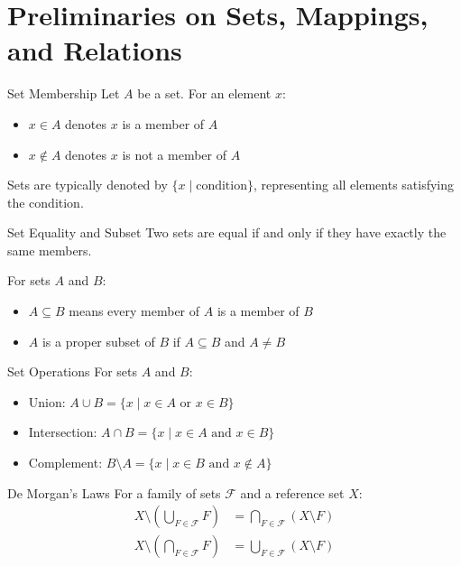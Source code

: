 \section{Preliminaries on Sets, Mappings, and Relations}

\begin{definitionbox}{Set Membership}
Let $A$ be a set. For an element $x$:
\begin{itemize}
    \item $x \in A$ denotes $x$ is a member of $A$
    \item $x \notin A$ denotes $x$ is not a member of $A$
\end{itemize}
Sets are typically denoted by $\{x \mid \text{condition}\}$, representing all elements satisfying the condition.
\end{definitionbox}

\begin{definitionbox}{Set Equality and Subset}
Two sets are equal if and only if they have exactly the same members.

For sets $A$ and $B$:
\begin{itemize}
    \item $A \subseteq B$ means every member of $A$ is a member of $B$
    \item $A$ is a proper subset of $B$ if $A \subseteq B$ and $A \neq B$
\end{itemize}
\end{definitionbox}

\begin{definitionbox}{Set Operations}
For sets $A$ and $B$:
\begin{itemize}
    \item Union: $A \cup B = \{x \mid x \in A \text{ or } x \in B\}$
    \item Intersection: $A \cap B = \{x \mid x \in A \text{ and } x \in B\}$
    \item Complement: $B \setminus A = \{x \mid x \in B \text{ and } x \notin A\}$
\end{itemize}
\end{definitionbox}

\begin{theorembox}{De Morgan's Laws}
For a family of sets $\mathcal{F}$ and a reference set $X$:
\begin{align*}
    X \setminus \left(\bigcup_{F \in \mathcal{F}} F\right) &= \bigcap_{F \in \mathcal{F}} (X \setminus F) \\
    X \setminus \left(\bigcap_{F \in \mathcal{F}} F\right) &= \bigcup_{F \in \mathcal{F}} (X \setminus F)
\end{align*}
\end{theorembox}

